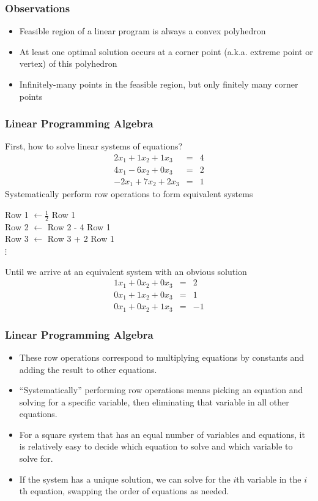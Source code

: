 \documentclass[12pt,handout]{beamer}
\begin{document}
\begin{frame}
\frametitle{Observations}
\begin{itemize}
\item Feasible region of a linear program is always a convex polyhedron
\item At least one optimal solution occurs at a corner point (a.k.a. extreme point or vertex) of this polyhedron
\item Infinitely-many points in the feasible region, but only finitely many corner points
\end{itemize}
\end{frame}

\begin{frame}
\frametitle{Linear Programming Algebra}
First, how to solve linear systems of equations?
\begin{eqnarray}
2 x_1 + 1 x_2 + 1 x_3 &=& 4 \nonumber \\
4 x_1 - 6 x_2 + 0 x_3 &=& 2 \nonumber \\
-2 x_1 + 7 x_2 + 2 x_3 &=& 1 \nonumber
\end{eqnarray}
Systematically perform row operations to form equivalent systems
\begin{center}
Row 1 $\leftarrow \frac{1}{2}$ Row 1 \\
Row 2 $\leftarrow$ Row 2 - 4 Row 1 \\
Row 3 $\leftarrow$ Row 3 + 2 Row 1 \\
$\vdots$ \\
\end{center}
Until we arrive at an equivalent system with an obvious solution
\begin{eqnarray}
1 x_1 + 0 x_2 + 0 x_3 &=& 2 \nonumber \\
0 x_1 + 1 x_2 + 0 x_3 &=& 1 \nonumber \\
0 x_1 + 0 x_2 + 1 x_3 &=& -1 \nonumber
\end{eqnarray}
\end{frame}

\begin{frame}
\frametitle{Linear Programming Algebra}
\begin{itemize}
\item These row operations correspond to multiplying equations by constants and adding the result to other equations.
\item ``Systematically'' performing row operations means picking an equation and solving for a specific variable, then eliminating that variable in all other equations.
\item For a square system that has an equal number of variables and equations, it is relatively easy to decide which equation to solve and which variable to solve for.
\item If the system has a unique solution, we can solve for the $i$th variable in the $i$th equation, swapping the order of equations as needed.
\end{itemize}
\end{frame}
\end{document}
